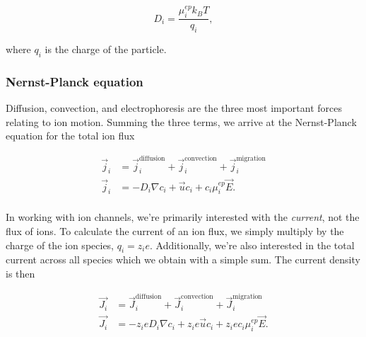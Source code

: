 				\begin{equation} \label{eq:einsteinsmoluchowski} \tag{Einstein-Smoluchowski relation}
					D_{i}=\frac{\mu^{ep}_{i}k_{B}T}{q_{i}},
				\end{equation}
				
				where $q_{i}$ is the charge of the particle.
				
				\subsubsection{Nernst-Planck equation}
					
				Diffusion, convection, and electrophoresis are the three most important forces relating to ion motion. Summing the three terms, we arrive at the Nernst-Planck equation for the total ion flux
				
				\begin{equation} \label{eq:nernstplanck} \tag{Nernst-Planck equation}
					\begin{align}
						\vec{j}_{i}&=\vec{j}^{\mathrm{diffusion}}_{i}+\vec{j}^{\mathrm{convection}}_{i}+\vec{j}^{\mathrm{migration}}_{i} \\
						\vec{j}_{i}&=-D_{i}\nabla c_{i}+\vec{u}c_{i}+c_{i}\mu^{ep}_{i}\vec{E}. \\
					\end{align} 
				\end{equation}
				
				In working with ion channels, we're primarily interested with the \textit{current}, not the flux of ions. To calculate the current of an ion flux, we simply multiply by the charge of the ion species, $q_{i}=z_{i}e$. Additionally, we're also interested in the total current across all species which we obtain with a simple sum. The current density is then 

				\begin{equation} \label{eq:currentdensity} \tag{Ionic current density}
					\begin{align}
						\vec{J_{i}}&=\vec{J}^{\mathrm{diffusion}}_{i}+\vec{J}^{\mathrm{convection}}_{i}+\vec{J}^{\mathrm{migration}}_{i} \\
						\vec{J_{i}}&=-z_{i}eD_{i}\nabla c_{i}+z_{i}e\vec{u}c_{i} +z_{i}ec_{i}\mu^{ep}_{i}\vec{E}. \\
					\end{align} 
				\end{equation}
				
